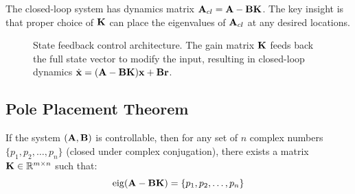 The closed-loop system has dynamics matrix $\mathbf{A}_{cl} = \mathbf{A} - \mathbf{B}\mathbf{K}$. The key insight is that proper choice of $\mathbf{K}$ can place the eigenvalues of $\mathbf{A}_{cl}$ at any desired locations.

\begin{figure}[htbp]
\centering
{}
\caption{State feedback control architecture. The gain matrix $\mathbf{K}$ feeds back the full state vector to modify the input, resulting in closed-loop dynamics $\dot{\mathbf{x}} = (\mathbf{A}-\mathbf{B}\mathbf{K})\mathbf{x} + \mathbf{B}\mathbf{r}$.}
\label{fig:state_feedback}
\end{figure}

\subsection{Pole Placement Theorem}

\begin{theorem}
\label{thm:pole_placement}
If the system $(\mathbf{A}, \mathbf{B})$ is controllable, then for any set of $n$ complex numbers $\{p_1, p_2, \ldots, p_n\}$ (closed under complex conjugation), there exists a matrix $\mathbf{K} \in \mathbb{R}^{m \times n}$ such that:
\begin{equation}
\operatorname{eig}(\mathbf{A} - \mathbf{B}\mathbf{K}) = \{p_1, p_2, \ldots, p_n\}
\end{equation}
\end{theorem}


